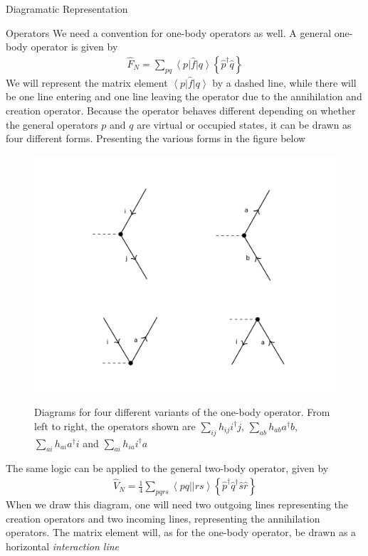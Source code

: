 \documentclass[twoside,english]{uiofysmaster}
\begin{document}
\begin{chapter}{Diagramatic Representation}
	\begin{section}{Operators}
		We need a convention for one-body operators as well. A general one-body operator is given by 
		\begin{align}
			\hat F_N = \sum_{pq} \left< p \right| \hat f \left| q \right> \left\{ \hat p^\dagger \hat q \right\}
		\end{align}
		We will represent the matrix element $\left< p \right| \hat f \left| q \right>$ by a dashed line, while there will be one line entering and one line leaving the operator due to the annihilation and creation operator. Because the operator behaves different depending on whether the general operators $p$ and $q$ are virtual or occupied states, it can be drawn as four different forms. Presenting the various forms in the figure below \cite{ShavittAndBartlett}
		\begin{figure}[H]
			\includegraphics[width=\textwidth]{Figures/OneBodyOperator.pdf}
			\label{OneBodyOperator}
			\caption{Diagrams for four different variants of the one-body operator. From left to right, the operators shown are $\sum_{ij} h_{ij} i^\dagger j $, $\sum_{ab} h_{ab} a^\dagger b$, $\sum_{ai}h_{ai} a^\dagger i$ and $\sum_{ai} h_{ia} i^\dagger a$}
		\end{figure}
		The same logic can be applied to the general two-body operator, given by 
		\begin{align}
			\hat V_N = \frac{1}{4} \sum_{pqrs} \left<pq||rs\right> \left\{ \hat p^\dagger \hat q^\dagger \hat s \hat r \right\}
		\end{align}
		When we draw this diagram, one will need two outgoing lines representing the creation operators and two incoming lines, representing the annihilation operators. The matrix element will, as for the one-body operator, be drawn as a horizontal \textit{interaction line}

\end{section}
\end{chapter}
\end{document}
